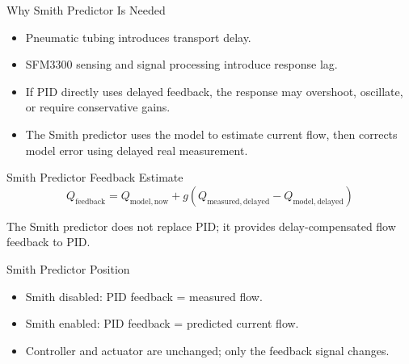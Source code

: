\documentclass[aspectratio=169,10pt]{beamer}
\begin{document}
\begin{frame}{Why Smith Predictor Is Needed}
  \begin{itemize}
    \item Pneumatic tubing introduces transport delay.
    \item SFM3300 sensing and signal processing introduce response lag.
    \item If PID directly uses delayed feedback, the response may overshoot, oscillate, or require conservative gains.
    \item The Smith predictor uses the model to estimate current flow, then corrects model error using delayed real measurement.
  \end{itemize}

  \vspace{0.6em}
  \begin{block}{Smith Predictor Feedback Estimate}
    \[
      Q_{\mathrm{feedback}}
      =
      Q_{\mathrm{model,now}}
      +
      g\left(
      Q_{\mathrm{measured,delayed}}
      -
      Q_{\mathrm{model,delayed}}
      \right)
    \]
  \end{block}

  \vspace{0.2em}
  \centering
  The Smith predictor does not replace PID; it provides delay-compensated flow feedback to PID.
\end{frame}

\begin{frame}{Smith Predictor Position}
  \centering

  \vspace{0.8em}
  \begin{itemize}
    \item Smith disabled: PID feedback = measured flow.
    \item Smith enabled: PID feedback = predicted current flow.
    \item Controller and actuator are unchanged; only the feedback signal changes.
  \end{itemize}
\end{frame}
\end{document}
